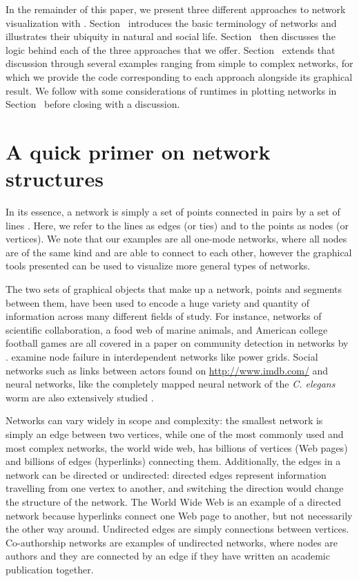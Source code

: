 In the remainder of this paper, we present three different approaches to network visualization with . Section~ introduces the basic terminology of networks and illustrates their ubiquity in natural and social life. Section~ then discusses the logic behind each of the three approaches that we offer. Section~ extends that discussion through several examples ranging from simple to complex networks, for which we provide the code corresponding to each approach alongside its graphical result. We follow with some considerations of runtimes in plotting networks in Section~ before closing with a discussion.

\section{A quick primer on network structures}
\label{sec:background}

In its essence, a network is simply a set of points connected in pairs by a set of lines \citep{newman}. Here, we refer to the lines as edges (or ties) and to the points as nodes (or vertices). We note that our examples are all one-mode networks, where all nodes are of the same kind and are able to connect to each other, however the graphical tools presented can be used to visualize more general types of networks. %

The two sets of graphical objects that make up a network, points and segments between them, have been used to encode a huge variety and quantity of information across many different fields of study. For instance, networks of scientific collaboration, a food web of marine animals, and American college football games are all covered in a paper on community detection in networks by \citet{football}. \citet{networkfailures} examine node failure in interdependent networks like power grids.  Social networks such as links between actors found on \url{http://www.imdb.com/} and neural networks, like the completely mapped neural network of the \textit{C. elegans} worm are also extensively studied \citep{smallworld}.

Networks can vary widely in scope and complexity: the smallest network is simply an edge between two vertices, while one of the most commonly used and most complex networks, the world wide web, has billions of vertices (Web pages) and billions of edges (hyperlinks) connecting them. Additionally, the edges in a network can be directed or undirected: directed edges represent information travelling from one vertex to another, and switching the direction would change the structure of the network. The World Wide Web is an example of a directed network because hyperlinks connect one Web page to another, but not necessarily the other way around. Undirected edges are simply connections between vertices. Co-authorship networks are examples of undirected networks, where nodes are authors and they are connected by an edge if they have written an academic publication together.

